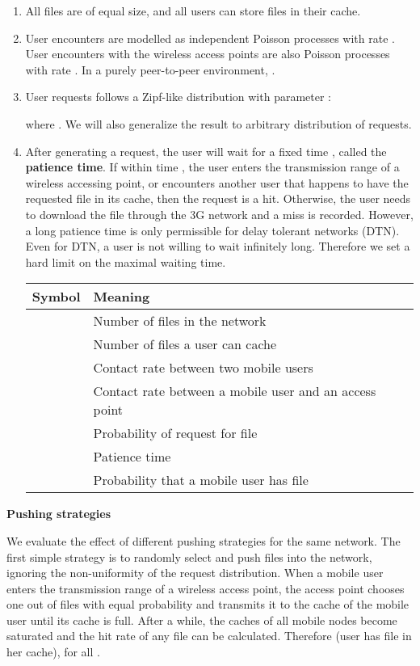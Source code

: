 \documentclass{sig-alternate}
\begin{document}
	\begin{enumerate}
	\item All files are of equal size, and all users can store  files in their cache.
	\item User encounters are modelled as independent Poisson processes with rate . User encounters with the wireless access points are also Poisson processes with rate .	In a purely peer-to-peer environment, . 
	\item User requests follows a Zipf-like distribution with parameter : 
		
where . We will also generalize the result to arbitrary distribution of requests.
	\item After generating a request, the user will wait for a fixed time , called the \textbf{patience time}. If within time , the user enters the transmission range of a wireless accessing point, or encounters another user that happens to have the requested file in its cache, then the request is a hit. Otherwise, the user needs to download the file through the 3G network and a miss is recorded. However, a long patience time is only permissible for delay tolerant networks (DTN). Even for DTN, a user is not willing to wait infinitely long. Therefore we set a hard limit on the maximal waiting time.

\begin{center}
    \begin{tabular}{ | l | p{5cm} |}
    \hline
    Symbol & Meaning \\ \hline
     & Number of files in the network \\ \hline
     & Number of files a user can cache \\ \hline
     & Contact rate between two mobile users \\ \hline
     & Contact rate between a mobile user and an access point \\ \hline
     & Probability of request for file  \\ \hline
     & Patience time	\\ \hline
     & Probability that a mobile user has file  \\ \hline
    \end{tabular}
\end{center}

\end{enumerate}	
	\textbf{Pushing strategies}
	\vspace{3mm}
	
	We evaluate the effect of different pushing strategies for the same network. The first simple strategy is to randomly select and push files into the network, ignoring the non-uniformity of the request distribution. When a mobile user enters the transmission range of a wireless access point, the access point chooses one out of  files with equal probability and transmits it to the cache of the mobile user until its cache is full. After a while, the caches of all mobile nodes become saturated and the hit rate of any file can be calculated. Therefore (user has file  in her cache), for all . 
	
\end{document}
